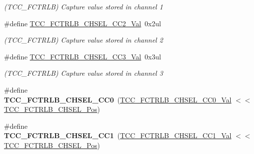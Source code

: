 \begin{DoxyCompactItemize}
\begin{DoxyCompactList}\small\item\em (T\+C\+C\+\_\+\+F\+C\+T\+R\+L\+B) Capture value stored in channel 1 \end{DoxyCompactList}\item 
\hypertarget{group___s_a_m_l21___t_c_c_ga773430cc474f09d65c1c0d5cae65386b}{}\#define \hyperlink{group___s_a_m_l21___t_c_c_ga773430cc474f09d65c1c0d5cae65386b}{T\+C\+C\+\_\+\+F\+C\+T\+R\+L\+B\+\_\+\+C\+H\+S\+E\+L\+\_\+\+C\+C2\+\_\+\+Val}~0x2ul\label{group___s_a_m_l21___t_c_c_ga773430cc474f09d65c1c0d5cae65386b}

\begin{DoxyCompactList}\small\item\em (T\+C\+C\+\_\+\+F\+C\+T\+R\+L\+B) Capture value stored in channel 2 \end{DoxyCompactList}\item 
\hypertarget{group___s_a_m_l21___t_c_c_gaba110aa38948afc54b119e596f4bc763}{}\#define \hyperlink{group___s_a_m_l21___t_c_c_gaba110aa38948afc54b119e596f4bc763}{T\+C\+C\+\_\+\+F\+C\+T\+R\+L\+B\+\_\+\+C\+H\+S\+E\+L\+\_\+\+C\+C3\+\_\+\+Val}~0x3ul\label{group___s_a_m_l21___t_c_c_gaba110aa38948afc54b119e596f4bc763}

\begin{DoxyCompactList}\small\item\em (T\+C\+C\+\_\+\+F\+C\+T\+R\+L\+B) Capture value stored in channel 3 \end{DoxyCompactList}\item 
\hypertarget{group___s_a_m_l21___t_c_c_ga8029bfc9739239472877034325ad6eb0}{}\#define {\bfseries T\+C\+C\+\_\+\+F\+C\+T\+R\+L\+B\+\_\+\+C\+H\+S\+E\+L\+\_\+\+C\+C0}~(\hyperlink{group___s_a_m_l21___t_c_c_gaccfd653c2d575d053cd2f989c5d5e7a6}{T\+C\+C\+\_\+\+F\+C\+T\+R\+L\+B\+\_\+\+C\+H\+S\+E\+L\+\_\+\+C\+C0\+\_\+\+Val}      $<$$<$ \hyperlink{group___s_a_m_l21___t_c_c_ga6080af4e19870994e6c7f4170fb48da7}{T\+C\+C\+\_\+\+F\+C\+T\+R\+L\+B\+\_\+\+C\+H\+S\+E\+L\+\_\+\+Pos})\label{group___s_a_m_l21___t_c_c_ga8029bfc9739239472877034325ad6eb0}

\item 
\hypertarget{group___s_a_m_l21___t_c_c_ga55ef65d1ca83ac76bc28ff0061128805}{}\#define {\bfseries T\+C\+C\+\_\+\+F\+C\+T\+R\+L\+B\+\_\+\+C\+H\+S\+E\+L\+\_\+\+C\+C1}~(\hyperlink{group___s_a_m_l21___t_c_c_gae2863c63db3b6682fa4c810160ea02c8}{T\+C\+C\+\_\+\+F\+C\+T\+R\+L\+B\+\_\+\+C\+H\+S\+E\+L\+\_\+\+C\+C1\+\_\+\+Val}      $<$$<$ \hyperlink{group___s_a_m_l21___t_c_c_ga6080af4e19870994e6c7f4170fb48da7}{T\+C\+C\+\_\+\+F\+C\+T\+R\+L\+B\+\_\+\+C\+H\+S\+E\+L\+\_\+\+Pos})\label{group___s_a_m_l21___t_c_c_ga55ef65d1ca83ac76bc28ff0061128805}


\end{DoxyCompactItemize}
